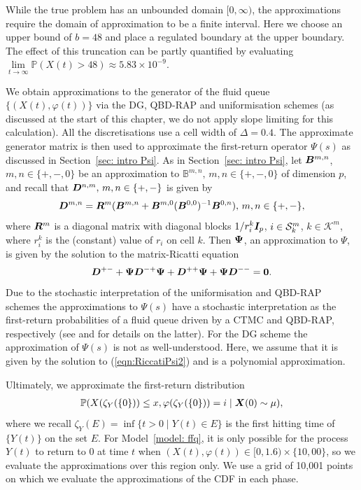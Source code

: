 While the true problem has an unbounded domain $[0,\infty)$, the approximations require the domain of approximation to be a finite interval. Here we choose an upper bound of \(b=48\) and place a regulated boundary at the upper boundary. The effect of this truncation can be partly quantified by evaluating \(\lim\limits_{t\to\infty}\mathbb P\left(X(t) > 48\right)\approx 5.83 \times 10^{-9}\). 

We obtain approximations to the generator of the fluid queue \(\{(X(t),\varphi(t))\}\) via the DG, QBD-RAP and uniformisation schemes (as discussed at the start of this chapter, we do not apply slope limiting for this calculation). All the discretisations use a cell width of \(\Delta=0.4\). The approximate generator matrix is then used to approximate the first-return operator \(\mathbb\Psi(s)\) as discussed in Section~\ref{sec: intro Psi}. As in Section~\ref{sec: intro Psi}, let \(\boldsymbol{B}^{m,n}\), \(m,n\in\{+,-,0\}\) be an approximation to \(\mathbb B^{m,n},\, m,n\in\{+,-,0\}\) of dimension \(p\), and recall that \(\boldsymbol{D}^{n,m},\,m,n\in\{+,-\}\) is given by 
\[\boldsymbol D^{m,n} = \boldsymbol{R}^m (\boldsymbol{B}^{m,n} + \boldsymbol{B}^{m,0}(\boldsymbol B^{0,0})^{-1}\boldsymbol{B}^{0,n}), \, m,n\in\{+,-\}, \]
where \(\boldsymbol R^m\) is a diagonal matrix with diagonal blocks \(1/r_i^k\boldsymbol{I}_p\), \(i\in\mathcal{S}_k^m\), \(k\in\mathcal K^m\), where \(r_i^k\) is the (constant) value of \(r_i\) on cell \(k\).
Then \(\boldsymbol{\Psi}\), an approximation to \(\mathbb \Psi\), is given by the solution to the matrix-Ricatti equation 
\begin{align}\label{eqn:RiccatiPsi2}
    \boldsymbol D^{+-}
+ \boldsymbol \Psi   \boldsymbol D^{-+}\boldsymbol \Psi
+   \boldsymbol D^{++}\boldsymbol \Psi
+ \boldsymbol \Psi  \boldsymbol D^{--}
= \boldsymbol 0.
\end{align}
Due to the stochastic interpretation of the uniformisation and QBD-RAP schemes the approximations to \(\mathbb \Psi(s)\) have a stochastic interpretation as the first-return probabilities of a fluid queue driven by a CTMC and QBD-RAP, respectively (see \cite[Chapter~7]{p2019} and \cite{bgnp2021} for details on the latter). For the DG scheme the approximation of \(\mathbb \Psi(s)\) is not as well-understood. Here, we assume that it is given by the solution to (\ref{eqn:RiccatiPsi2}) and is a polynomial approximation. %

Ultimately, we approximate the first-return distribution 
\begin{align}\label{eqn: first return Y 1}
	\mathbb P(X(\zeta_{Y}(\{0\}))\leq x, \varphi(\zeta_{Y}(\{0\}))=i\mid \boldsymbol X(0)\sim \mu),
\end{align}
where we recall \(\zeta_{Y}(E) = \inf\{t>0\mid Y(t)\in E\}\) is the first hitting time of \(\{Y(t)\}\) on the set \(E\). For Model~\ref{model: ffq}, it is only possible for the process \(Y(t)\) to return to \(0\) at time \(t\) when \((X(t),\varphi(t))\in[0,1.6)\times \{10,00\}\), so we evaluate the approximations over this region only. We use a grid of 10,001 points on which we evaluate the approximations of the CDF in each phase. 

